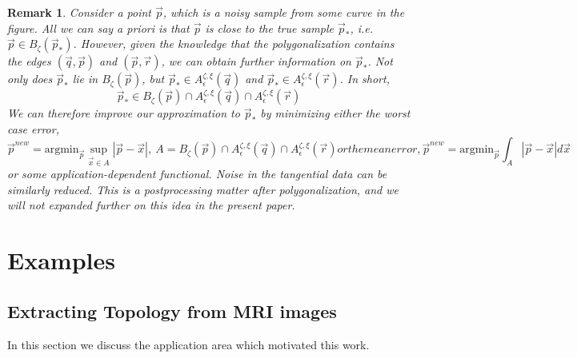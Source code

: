 \documentclass{article}
\newtheorem{varremark}[cntr]{Remark}
\newenvironment{remark}{\begin{varremark}\em}{\em\end{varremark}}
\numberwithin{cntr}{section}
\numberwithin{equation}{section}
\newcommand{\abs}[1]{\left| #1 \right|}%
\newcommand{\vx}[0]{{\vec{x}}}
\newcommand{\vp}[0]{{\vec{p}}}
\newcommand{\vq}[0]{{\vec{q}}}
\newcommand{\vr}[0]{{\vec{r}}}
\newcommand{\ball}[2]{ { B_{#1}(#2) } }
\newcommand{\pointNoise}{{\zeta}}
\newcommand{\tanNoise}{{\xi}}
\newcommand{\nallowed}[2]{ { A^{\pointNoise, \tanNoise}_{#1}(#2) } }
\begin{document}
\begin{remark}
Consider a point $\vp$, which is a noisy sample from some curve in the figure.
All we can say a priori is that $\vp$ is close to the true
sample $\vp_{\ast}$, i.e. $\vp \in \ball{\pointNoise}{\vp_{\ast}}$.
However, given the knowledge that the polygonalization contains
the edges $(\vq,\vp)$ and $(\vp,\vr)$, we can obtain further information
on $\vp_{\ast}$. Not only does $\vp_{\ast}$ lie in $\ball{\pointNoise}{\vp}$,
but $\vp_{\ast} \in \nallowed{\epsilon}{\vq}$ and
$\vp_{\ast} \in \nallowed{\epsilon}{\vr}$. In short,
\begin{equation}
  \label{eq:noisyFilteringFromAllowedRegions}
  \vp_{\ast} \in \ball{\pointNoise}{\vp} \cap \nallowed{\epsilon}{\vq} \cap  \nallowed{\epsilon}{\vr}
\end{equation}
We can therefore improve our approximation to $\vp_{\ast}$ by minimizing
either the worst case error,
\begin{subequations}
  \begin{equation}
    \vp^{new} = \textrm{argmin}_{\vp}  \sup_{\vx \in A} \abs{\vp - \vx}, ~ A = \ball{\pointNoise}{\vp} \cap \nallowed{\epsilon}{\vq} \cap  \nallowed{\epsilon}{\vr}
  \end{equation}
  or the mean error,
  \begin{equation}
    \vp^{new} = \textrm{argmin}_{\vp}  \int_{A} \abs{\vp - \vx} d\vx
  \end{equation}
\end{subequations}
or some application-dependent functional.
Noise in the tangential data can be similarly reduced.
This is a postprocessing matter after polygonalization,
and we will not expanded further on this idea in the present paper.
\end{remark}

\section{Examples}

\subsection{Extracting Topology from MRI images}
\label{sec:MRI}

In this section we discuss the application area which motivated this work.
\end{document}
